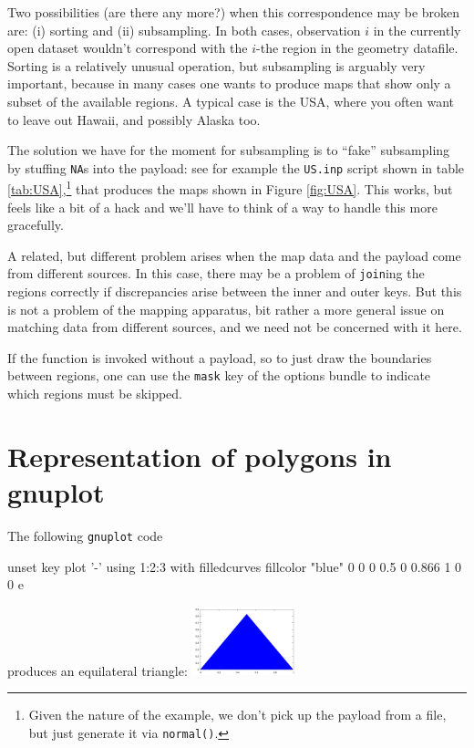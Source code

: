 \documentclass[a4paper]{article}
\begin{document}
Two possibilities (are there any more?) when this correspondence may
be broken are: (i) sorting and (ii) subsampling. In both cases,
observation $i$ in the currently open dataset wouldn't correspond with
the $i$-the region in the geometry datafile. Sorting is a relatively
unusual operation, but subsampling is arguably very important, because
in many cases one wants to produce maps that show only a subset of the
available regions. A typical case is the USA, where you often want to
leave out Hawaii, and possibly Alaska too.

The solution we have for the moment for subsampling is to ``fake''
subsampling by stuffing \texttt{NA}s into the payload: see for example
the \texttt{US.inp} script shown in table
\ref{tab:USA},\footnote{Given the nature of the example, we don't pick
  up the payload from a file, but just generate it via
  \texttt{normal()}.}  that produces the maps shown in Figure
\ref{fig:USA}. This works, but feels like a bit of a hack and we'll
have to think of a way to handle this more gracefully.

A related, but different problem arises when the map data and the
payload come from different sources. In this case, there may be a
problem of \texttt{join}ing the regions correctly if discrepancies
arise between the inner and outer keys. But this is not a problem of
the mapping apparatus, bit rather a more general issue on matching
data from different sources, and we need not be concerned with it
here.

If the  function is invoked without a payload, so to just
draw the boundaries between regions, one can use the \texttt{mask} key
of the options bundle to indicate which regions must be skipped.

\appendix

\section{Representation of polygons in gnuplot}
\label{sec:gnuplot}

The
following \texttt{gnuplot} code
\begin{code}
  unset key
  plot '-' using 1:2:3 with filledcurves fillcolor "blue"
  0 0 0
  0.5 0 0.866
  1 0 0
  e
\end{code}
produces an equilateral triangle: \includegraphics[height=2cm]{triangle.png}
\end{document}
